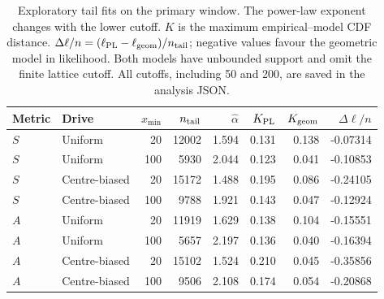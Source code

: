 \begin{table}[htbp]
\centering
\small
\caption{Exploratory tail fits on the primary window. The power-law exponent changes with the lower cutoff. $K$ is the maximum empirical--model CDF distance. $\Delta\ell/n=(\ell_{\rm PL}-\ell_{\rm geom})/n_{\rm tail}$; negative values favour the geometric model in likelihood. Both models have unbounded support and omit the finite lattice cutoff. All cutoffs, including 50 and 200, are saved in the analysis JSON.}
\label{tab:tail}
\begin{tabular}{@{}ll@{\hspace{2em}}rrrrrr@{}}
\toprule
Metric & Drive & $x_{\min}$ & $n_{\rm tail}$ & $\widehat\alpha$ & $K_{\rm PL}$ & $K_{\rm geom}$ & $\Delta\ell/n$\\
\midrule
$S$ & Uniform & 20 & 12002 & 1.594 & 0.131 & 0.138 & -0.07314\\
$S$ & Uniform & 100 & 5930 & 2.044 & 0.123 & 0.041 & -0.10853\\
$S$ & Centre-biased & 20 & 15172 & 1.488 & 0.195 & 0.086 & -0.24105\\
$S$ & Centre-biased & 100 & 9788 & 1.921 & 0.143 & 0.047 & -0.12924\\
$A$ & Uniform & 20 & 11919 & 1.629 & 0.138 & 0.104 & -0.15551\\
$A$ & Uniform & 100 & 5657 & 2.197 & 0.136 & 0.040 & -0.16394\\
$A$ & Centre-biased & 20 & 15102 & 1.524 & 0.210 & 0.045 & -0.35856\\
$A$ & Centre-biased & 100 & 9506 & 2.108 & 0.174 & 0.054 & -0.20868\\
\bottomrule
\end{tabular}
\end{table}
